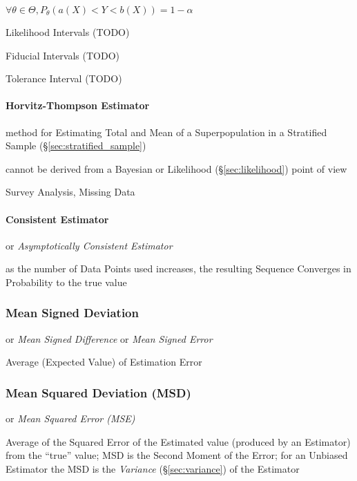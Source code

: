 $\forall \theta \in \Theta, P_\theta(a(X) < Y < b(X)) = 1 - \alpha$

Likelihood Intervals (TODO)

Fiducial Intervals (TODO)

Tolerance Interval (TODO)



\paragraph{Horvitz-Thompson Estimator}\label{sec:horvitz_thompson}\hfill

method for Estimating Total and Mean of a Superpopulation in a Stratified Sample
(\S\ref{sec:stratified_sample})

cannot be derived from a Bayesian or Likelihood (\S\ref{sec:likelihood}) point
of view

Survey Analysis, Missing Data



\paragraph{Consistent Estimator}\label{sec:consistent_estimator}\hfill

or \emph{Asymptotically Consistent Estimator}

as the number of Data Points used increases, the resulting Sequence Converges in
Probability to the true value



\subsubsection{Mean Signed Deviation}\label{sec:mean_signed_deviation}

or \emph{Mean Signed Difference} or \emph{Mean Signed Error}

Average (Expected Value) of Estimation Error



\subsubsection{Mean Squared Deviation (MSD)}\label{sec:msd}

or \emph{Mean Squared Error (MSE)}

Average of the Squared Error of the Estimated value (produced by an Estimator)
from the ``true'' value; MSD is the Second Moment of the Error; for an Unbiased
Estimator the MSD is the \emph{Variance} (\S\ref{sec:variance}) of the Estimator

